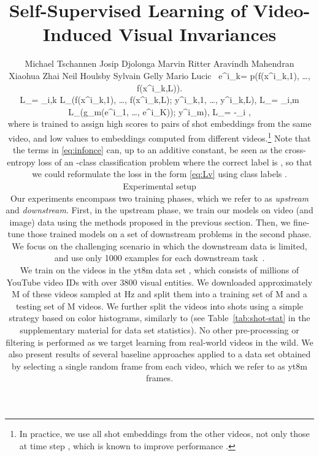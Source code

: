 \documentclass[10pt,twocolumn,letterpaper]{article}
\newcommand{\eik}{e^i_k}
\newcommand{\eione}{e^i_1}
\newcommand{\eiK}{e^i_K}
\newcommand{\xikone}{x^i_{k,1}}
\newcommand{\yikL}{y^i_{k,L}}
\newcommand{\yikone}{y^i_{k,1}}
\newcommand{\xikL}{x^i_{k,L}}
\newcommand{\yim}{y^i_m}
\newcommand{\ls}{L_\text{S}}
\newcommand{\lv}{L_\text{V}}
\newcommand{\Ls}{\mathcal L_\text{S}}
\newcommand{\Lv}{\mathcal L_\text{V}}
\newcommand{\Lnce}{\mathcal L_\text{NCE}}
\newcommand{\gm}{g_m}
\renewcommand{\paragraph}[1]{\noindent{\bf #1}\quad}
\begin{document}
\title{Self-Supervised Learning of Video-Induced Visual Invariances}


\author{Michael Tschannen \quad Josip Djolonga \quad Marvin Ritter \quad Aravindh Mahendran \\
Xiaohua Zhai \quad Neil Houlsby \quad Sylvain Gelly \quad Mario Lucic \
\eik = p(f(\xikone), \ldots, f(\xikL)).

    \Ls = \sum_{i,k} \ls(f(\xikone), \ldots, f(\xikL); \yikone, \ldots, \yikL),
 \label{eq:Lv}
    \Lv = \sum_{i,m} \lv(\gm(\eione, \ldots, \eiK)); \yim),
\label{eq:infonce}
     \Lnce = -\sum_i \log {},

where  is trained to assign high scores to pairs of shot embeddings from the same video, and low values to embeddings computed from different videos.\footnote{In practice, we use all shot embeddings from the other videos, not only those at time step , which is known to improve performance \cite{oord2018representation}.} Note that the terms in \eqref{eq:infonce} can, up to an additive constant, be seen as the cross-entropy loss of an -class classification problem where the correct label is , so that we could reformulate the loss in the form \eqref{eq:Lv} using class labels .

\section{Experimental setup} \label{sec:exp-setup}
Our experiments encompass two training phases, which we refer to as \emph{upstream} and \emph{downstream}.
First, in the upstream phase, we train our models on video (and image) data using the methods proposed in the previous section.
Then, we fine-tune those trained models on a set of downstream problems in the second phase.
We focus on the challenging scenario in which the downstream data is limited, and use only 1000 examples for each downstream task~\cite{zhai2019visual}.

\paragraph{Upstream training}
We train on the videos in the \gls{yt8m} data set \cite{abu2016youtube}, which consists of millions of YouTube video IDs with over 3800 visual entities.
We downloaded approximately M of these videos sampled at  Hz and split them into a training set of M and a testing set of M videos.
We further split the videos into shots using a simple strategy based on color histograms, similarly to \cite{mas2003video} (see Table~\ref{tab:shot-stat} in the supplementary material for data set statistics). No other pre-processing or filtering is performed as we target learning from real-world videos in the wild. We also present results of several baseline approaches applied to a data set obtained by selecting a single random frame from each video, which we refer to as \gls{yt8m} frames.

}
\end{document}
